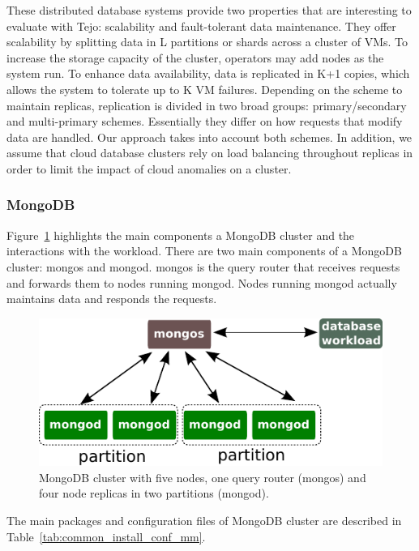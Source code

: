 These distributed database systems provide two properties that are interesting to evaluate with Tejo: scalability and fault-tolerant data maintenance. They offer scalability by splitting data in L partitions or shards across a cluster of VMs. To increase the storage capacity of the cluster, operators may add nodes as the system run. To enhance data availability, data is replicated in K+1 copies, which allows the system to tolerate up to K VM failures. Depending on the scheme to maintain replicas, replication is divided in two broad groups: primary/secondary and multi-primary schemes. Essentially they differ on how requests that modify data are handled. Our approach takes into account both schemes. In addition, we assume that cloud database clusters rely on load balancing throughout replicas in order to limit the impact of cloud anomalies on a cluster.



\subsubsection{MongoDB}
\label{subsub:mongo}

Figure~\ref{fig:mongo_cluster} highlights the main components a MongoDB cluster and the interactions with the workload. There are two main components of a MongoDB cluster: mongos and mongod. mongos is the query router that receives requests and forwards them to nodes running mongod. Nodes running mongod actually maintains data and responds the requests. 

\begin{figure}[!h]
  \centering
     \includegraphics[width=.6\textwidth]{inputs/img/mongo_cluster}
  \caption{MongoDB cluster with five nodes, one query router (mongos) and four node replicas in two partitions (mongod).}
  \label{fig:mongo_cluster}
\end{figure}

The main packages and configuration files of MongoDB cluster are described in Table~\ref{tab:common_install_conf_mm}.

